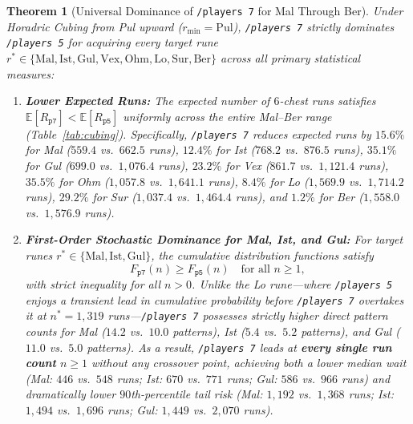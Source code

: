 \documentclass[11pt,reqno]{amsart}
\newtheorem{theorem}{Theorem}[section]
\theoremstyle{definition}
\begin{document}
\begin{theorem}[Universal Dominance of \texttt{/players~7} for Mal Through Ber]
\label{thm:mal_ber}
Under Horadric Cubing from Pul upward ($r_{\min} = \text{Pul}$), \texttt{/players~7} strictly dominates \texttt{/players~5} for acquiring every target rune $r^* \in \{\text{Mal}, \text{Ist}, \text{Gul}, \text{Vex}, \text{Ohm}, \text{Lo}, \text{Sur}, \text{Ber}\}$ across all primary statistical measures:
\begin{enumerate}
    \item \textbf{Lower Expected Runs:} The expected number of $6$-chest runs satisfies $\mathbb{E}[R_{\texttt{p7}}] < \mathbb{E}[R_{\texttt{p5}}]$ uniformly across the entire Mal--Ber range (Table~\ref{tab:cubing}). Specifically, \texttt{/players~7} reduces expected runs by $15.6\%$ for Mal ($559.4$ vs.\ $662.5$ runs), $12.4\%$ for Ist ($768.2$ vs.\ $876.5$ runs), $35.1\%$ for Gul ($699.0$ vs.\ $1{,}076.4$ runs), $23.2\%$ for Vex ($861.7$ vs.\ $1{,}121.4$ runs), $35.5\%$ for Ohm ($1{,}057.8$ vs.\ $1{,}641.1$ runs), $8.4\%$ for Lo ($1{,}569.9$ vs.\ $1{,}714.2$ runs), $29.2\%$ for Sur ($1{,}037.4$ vs.\ $1{,}464.4$ runs), and $1.2\%$ for Ber ($1{,}558.0$ vs.\ $1{,}576.9$ runs).
    \item \textbf{First-Order Stochastic Dominance for Mal, Ist, and Gul:} For target runes $r^* \in \{\text{Mal}, \text{Ist}, \text{Gul}\}$, the cumulative distribution functions satisfy
    \begin{equation}
        F_{\texttt{p7}}(n) \ge F_{\texttt{p5}}(n) \quad \text{for all } n \ge 1,
    \end{equation}
    with strict inequality for all $n > 0$. Unlike the Lo rune—where \texttt{/players~5} enjoys a transient lead in cumulative probability before \texttt{/players~7} overtakes it at $n^* = 1{,}319$ runs—\texttt{/players~7} possesses strictly higher direct pattern counts for Mal ($14.2$ vs.\ $10.0$ patterns), Ist ($5.4$ vs.\ $5.2$ patterns), and Gul ($11.0$ vs.\ $5.0$ patterns). As a result, \texttt{/players~7} leads at \textbf{every single run count} $n \ge 1$ without any crossover point, achieving both a lower median wait (Mal: $446$ vs.\ $548$ runs; Ist: $670$ vs.\ $771$ runs; Gul: $586$ vs.\ $966$ runs) and dramatically lower $90$th-percentile tail risk (Mal: $1{,}192$ vs.\ $1{,}368$ runs; Ist: $1{,}494$ vs.\ $1{,}696$ runs; Gul: $1{,}449$ vs.\ $2{,}070$ runs).
\end{enumerate}
\end{theorem}
\end{document}
